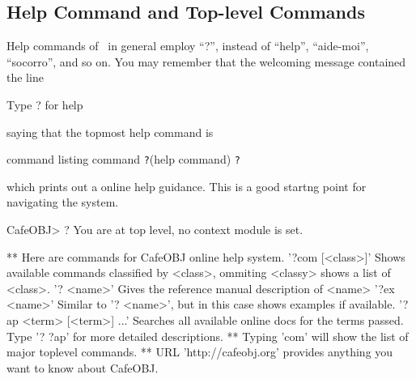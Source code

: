 \documentclass[a4paper]{memoir}
\begin{document}
\subsection{Help Command and Top-level Commands}\label{sec:p2-help-command}

Help commands of \cafeobj~in general employ ``?'', instead of
``help'', ``aide-moi'', ``socorro'', and so on. You may remember that
the welcoming message contained the line
\begin{vvtm}
\begin{ccode}
                              Type ? for help
\end{ccode}
\end{vvtm}
saying that the topmost help command is

\begin{bsyntax} command listing command \texttt{?}(help command)\Hline
\texttt{?}
\end{bsyntax}
which prints out a online help guidance. 
This is a good startng point for navigating the system.
\begin{vvtm}
\begin{ccode}
CafeOBJ> ?
You are at top level, no context module is set.

** Here are commands for CafeOBJ online help system.
'?com [<class>]'          Shows available commands classified by <class>,
                          ommiting <classy> shows a list of <class>.
'? <name>'                Gives the reference manual description of <name>
'?ex <name>'              Similar to '? <name>', but in this case
                          shows examples if available.
'?ap <term> [<term>] ...' Searches all available online docs for the terms
                          passed. Type '? ?ap' for more detailed descriptions.
** Typing 'com' will show the list of major toplevel commands.
** URL 'http://cafeobj.org' provides anything you want to know about CafeOBJ.
\end{ccode}
\end{vvtm}
\end{document}
